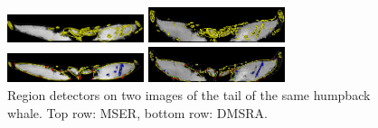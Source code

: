 \documentclass{article}
\begin{document}
\begin{figure}[htb]

\begin{minipage}[b]{.48\linewidth}
  \centering
  \centerline{\includegraphics[width=4.0cm]{./Figs/mserTailA}}
\end{minipage}
\begin{minipage}[b]{0.48\linewidth}
  \centering
  \centerline{\includegraphics[width=4.0cm]{./Figs/mserTailB}}
\end{minipage}

\begin{minipage}[b]{.48\linewidth}
  \centering
  \centerline{\includegraphics[width=4.0cm]{./Figs/dmsrTailA}}
\end{minipage}
\begin{minipage}[b]{0.48\linewidth}
  \centering
  \centerline{\includegraphics[width=4.0cm]{./Figs/dmsrTailB}}
\end{minipage}
 \vspace{-0.2cm}
\caption{Region detectors on two images of the tail of the same humpback whale. 
Top row: MSER, bottom row: DMSRA.}
\label{fig:tails}
%
\end{figure}
\end{document}
